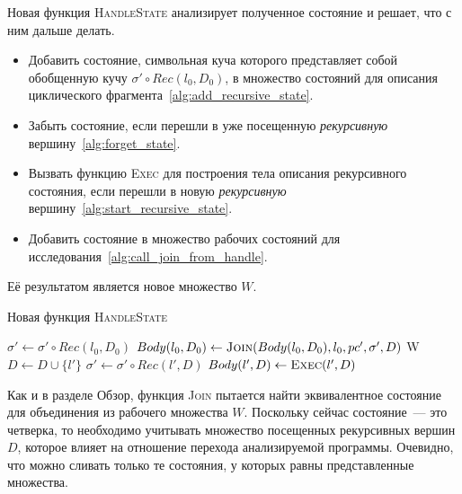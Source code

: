 Новая функция \textsc{HandleState} анализирует полученное состояние и решает, что с ним дальше делать.
\begin{itemize}
    \item Добавить состояние, символьная куча которого представляет собой обобщенную кучу $\sigma' \circ Rec(l_0,D_0)$, в множество состояний для описания циклического фрагмента~\ref{alg:add_recursive_state}.
    \item Забыть состояние, если перешли в уже посещенную \emph{рекурсивную} вершину~\ref{alg:forget_state}.
    \item Вызвать функцию \textsc{Exec} для построения тела описания рекурсивного состояния, если перешли в новую \emph{рекурсивную} вершину~\ref{alg:start_recursive_state}.
    \item Добавить состояние в множество рабочих состояний для исследования~\ref{alg:call_join_from_handle}.
\end{itemize}
Её результатом является новое множество $W$.

\begin{algorithm}
    \caption{Новая функция \textsc{HandleState}} \label{new_handle_state}
\begin{algorithmic}[1]
         \label{alg:deal_with_new_state_start}
            \State $\sigma' \gets \sigma' \circ Rec(l_0,D_0)$
            \State $Body(l_0,D_0) \gets \text{\textsc{Join}($Body(l_0,D_0), l_0, pc',\sigma',D$)}$
            \State \Return W \label{alg:add_recursive_state}
         \label{alg:forget_state}
            \State \Return
            \State $D \gets D \cup \{l'\}$
            \State $\sigma' \gets \sigma' \circ Rec(l',D)$ \label{alg:enter_recursive_symbol}
                \State $Body(l',D) \gets \text{\textsc{Exec}}(l',D)$ \label{alg:start_recursive_state}
            \EndIf
        \EndIf

        \State \Return {} \label{alg:call_join_from_handle}\;
    \EndProcedure
\end{algorithmic}
\end{algorithm}

Как и в разделе Обзор, функция \textsc{Join} пытается найти эквивалентное состояние для объединения из рабочего множества $W$. Поскольку сейчас состояние~--- это четверка, то необходимо учитывать множество посещенных рекурсивных вершин $D$, которое влияет на отношение перехода анализируемой программы.
Очевидно, что можно сливать только те состояния, у которых равны представленные множества.


